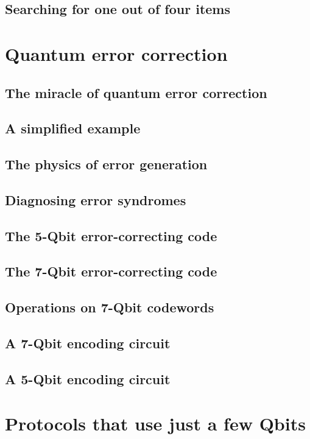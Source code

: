 \documentclass{book}
\theoremstyle{definition}
\begin{document}
\subsection{Searching for one out of four items}


\newpage

\section{Quantum error correction}

\subsection{The miracle of quantum error correction}
\subsection{A simplified example}
\subsection{The physics of error generation}
\subsection{Diagnosing error syndromes}
\subsection{The 5-Qbit error-correcting code}
\subsection{The 7-Qbit error-correcting code}
\subsection{Operations on 7-Qbit codewords}
\subsection{A 7-Qbit encoding circuit}
\subsection{A 5-Qbit encoding circuit}

\newpage

\section{Protocols that use just a few Qbits}
\end{document}
